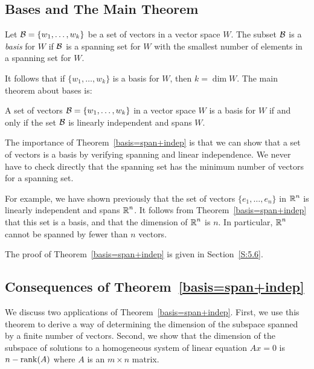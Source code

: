\documentclass{ximera}
\begin{document}
\subsection*{Bases and The Main Theorem}

\begin{definition} \label{basis}
Let ${\cal B} = \{w_1,\ldots,w_k\}$ be a set of vectors in a
vector space $W$.  The subset ${\cal B}$ is a {\em basis\/} for $W$
if ${\cal B}$ is a spanning set for $W$ with the smallest number
of elements in a spanning set for $W$.
\end{definition}  

It follows that if $\{w_1,\ldots,w_k\}$ is a basis for $W$, then
$k=\dim W$. The main theorem about bases is:

\begin{theorem}  \label{basis=span+indep}
A set of vectors ${\cal B} =\{w_1,\ldots,w_k\}$ in a vector space $W$
is a basis for $W$ if and only if the set ${\cal B}$ is linearly
independent and spans $W$.
\end{theorem}   

  The importance of Theorem~\ref{basis=span+indep} is
that we can show that a set of vectors is a basis by verifying spanning
and linear independence.   We never have to check directly that the spanning
set has the minimum number of vectors for a spanning set.


For example, we have shown previously that the set of vectors
$\{e_1,\ldots,e_n\}$ in $\mbox{$\Bbb{R}$}^n$ is linearly independent and spans $\mbox{$\Bbb{R}$}^n$.  It
follows from Theorem~\ref{basis=span+indep} that this set is a basis,
and that the dimension of $\mbox{$\Bbb{R}$}^n$ is $n$.
In particular, $\mbox{$\Bbb{R}$}^n$ cannot be spanned by fewer than $n$ vectors.

The proof of Theorem~\ref{basis=span+indep} is given in Section~\ref{S:5.6}.


\subsection*{Consequences of Theorem~\protect\ref{basis=span+indep}}

We discuss two applications of Theorem~\ref{basis=span+indep}.  First,
we use this theorem to derive a way of determining the dimension of the
subspace spanned by a finite number of vectors.  Second, we show that the
dimension of the subspace of solutions to a homogeneous system of linear
equation $Ax=0$ is $n-{\rm rank}(A)$ where $A$ is an $m\times n$ matrix.
\end{document}
